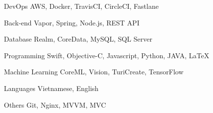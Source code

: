 

\begin{cvskills}

  \cvskill
    {DevOps} %
    {AWS, Docker, TravisCI, CircleCI, Fastlane} %

  \cvskill
    {Back-end} %
    {Vapor, Spring, Node.js, REST API} %

  \cvskill
    {Database} %
    {Realm, CoreData, MySQL, SQL Server} %

  \cvskill
    {Programming} %
    {Swift, Objective-C, Javascript, Python, JAVA, LaTeX} %

  \cvskill
    {Machine Learning} %
    {CoreML, Vision, TuriCreate, TensorFlow} %

  \cvskill
    {Languages} %
    {Vietnamese, English} %

  \cvskill
    {Others} %
    {Git, Nginx, MVVM, MVC} %

\end{cvskills}
